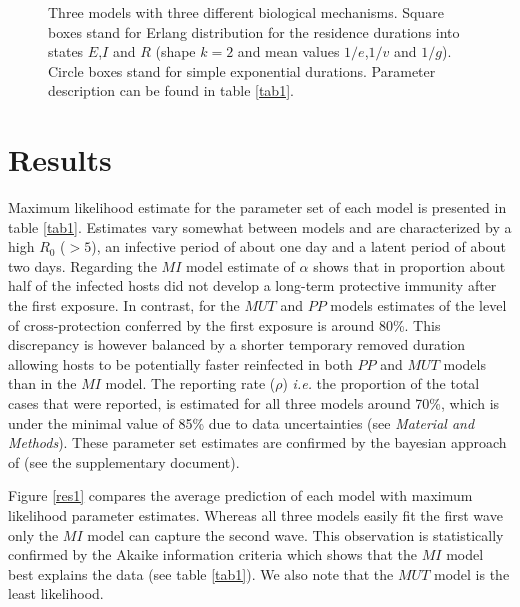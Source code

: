 \begin{figure}
\begin{center}
\end{center}
\caption{Three models with three different biological
  mechanisms. Square boxes stand for Erlang distribution for the
  residence durations into states $E$,$I$ and $R$ (shape $k=2$ and
  mean values $1/e$,$1/v$ and $1/g$). Circle boxes stand for simple
  exponential durations. Parameter description can be found in table
  \ref{tab1}.}
\label{fig:models_tdc}
\end{figure}


\section{Results}

Maximum likelihood estimate for the parameter set of each model is
presented in table \ref{tab1}. Estimates vary somewhat between models
and are characterized by a high $R_{0}$ ($> 5$), an infective period
of about one day and a latent period of about two days. Regarding the
$MI$ model estimate of $\alpha$ shows that in proportion about half of
the infected hosts did not develop a long-term protective immunity
after the first exposure. In contrast, for the $MUT$ and $PP$ models
estimates of the level of cross-protection conferred by the first
exposure is around 80\%. This discrepancy is however balanced by a
shorter temporary removed duration allowing hosts to be potentially
faster reinfected in both $PP$ and $MUT$ models than in the $MI$
model. The reporting rate ($\rho$) \textit{i.e.} the proportion of the
total cases that were reported, is estimated for all three models
around 70\%, which is under the minimal value of 85\% due to data
uncertainties (see \textsl{Material and Methods}). These parameter set
estimates are confirmed by the bayesian approach of \citet{Toni2009}
(see the supplementary document).

Figure \ref{res1} compares the average prediction of each model with
maximum likelihood parameter estimates. Whereas all three models
easily fit the first wave only the $MI$ model can capture the second
wave. This observation is statistically confirmed by the Akaike
information criteria which shows that the $MI$ model best explains the
data (see table \ref{tab1}). We also note that the $MUT$ model is the
least likelihood.


